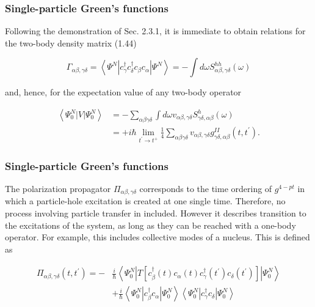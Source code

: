 \documentclass[compress]{beamer}
\begin{document}
\frame
{
\frametitle{Single-particle Green's functions}
\begin{small}
{\scriptsize
Following the demonstration of Sec. 2.3.1, it is immediate to obtain relations for the two-body density matrix (1.44)

$$
\Gamma_{\alpha \beta, \gamma \delta}=\left\langle\Psi^{N}\left|c_{\gamma}^{\dagger} c_{\delta}^{\dagger} c_{\beta} c_{\alpha}\right| \Psi^{N}\right\rangle=-\int d \omega S_{\alpha \beta, \gamma \delta}^{h h}(\omega)
$$

and, hence, for the expectation value of any two-body operator

$$
\begin{aligned}
\left\langle\Psi_{0}^{N}|V| \Psi_{0}^{N}\right\rangle & =-\sum_{\alpha \beta \gamma \delta} \int d \omega v_{\alpha \beta, \gamma \delta} S_{\gamma \delta, \alpha \beta}^{h}(\omega) \\
& =+i \hbar \lim _{t^{\prime} \rightarrow t^{+}} \frac{1}{4} \sum_{\alpha \beta \gamma \delta} v_{\alpha \beta, \gamma \delta} g_{\gamma \delta, \alpha \beta}^{I I}\left(t, t^{\prime}\right) .
\end{aligned}
$$

}
\end{small}
}
\frame
{
\frametitle{Single-particle Green's functions}
\begin{small}
{\scriptsize
The polarization propagator $\Pi_{\alpha \beta, \gamma \delta}$
corresponds to the time ordering of $g^{4-p t}$ in which a
particle-hole excitation is created at one single time. Therefore, no
process involving particle transfer in included. However it describes
transition to the excitations of the system, as long as they can be
reached with a one-body operator. For example, this includes
collective modes of a nucleus. This is defined as

$$
\begin{aligned}
\Pi_{\alpha \beta, \gamma \delta}\left(t, t^{\prime}\right)=- & \frac{i}{\hbar}\left\langle\Psi_{0}^{N}\left|T\left[c_{\beta}^{\dagger}(t) c_{\alpha}(t) c_{\gamma}^{\dagger}\left(t^{\prime}\right) c_{\delta}\left(t^{\prime}\right)\right]\right| \Psi_{0}^{N}\right\rangle \\
& +\frac{i}{\hbar}\left\langle\Psi_{0}^{N}\left|c_{\beta}^{\dagger} c_{\alpha}\right| \Psi_{0}^{N}\right\rangle\left\langle\Psi_{0}^{N}\left|c_{\gamma}^{\dagger} c_{\delta}\right| \Psi_{0}^{N}\right\rangle
\end{aligned}
$$

}
\end{small}
}
\end{document}
